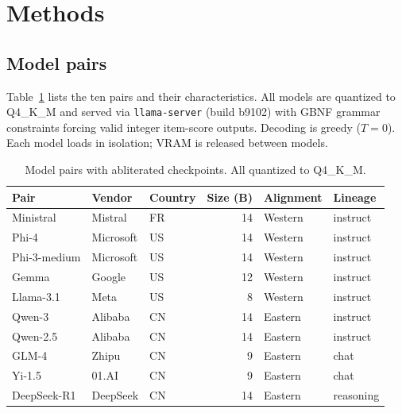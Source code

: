 \documentclass[11pt]{article}
\begin{document}
\section{Methods}

\subsection{Model pairs}
Table~\ref{tab:pairs} lists the ten pairs and their characteristics. All models are quantized to Q4\_K\_M and served via \texttt{llama-server} (build b9102) with GBNF grammar constraints forcing valid integer item-score outputs. Decoding is greedy ($T = 0$). Each model loads in isolation; VRAM is released between models.

\begin{table}[ht]
\centering
\caption{Model pairs with abliterated checkpoints. All quantized to Q4\_K\_M.}
\label{tab:pairs}
\small
\begin{tabular}{lllrll}
\toprule
Pair & Vendor & Country & Size (B) & Alignment & Lineage \\
\midrule
Ministral    & Mistral   & FR & 14 & Western & instruct  \\
Phi-4        & Microsoft & US & 14 & Western & instruct  \\
Phi-3-medium & Microsoft & US & 14 & Western & instruct  \\
Gemma        & Google    & US & 12 & Western & instruct  \\
Llama-3.1    & Meta      & US &  8 & Western & instruct  \\
Qwen-3       & Alibaba   & CN & 14 & Eastern & instruct  \\
Qwen-2.5     & Alibaba   & CN & 14 & Eastern & instruct  \\
GLM-4        & Zhipu     & CN &  9 & Eastern & chat      \\
Yi-1.5       & 01.AI     & CN &  9 & Eastern & chat      \\
DeepSeek-R1  & DeepSeek  & CN & 14 & Eastern & reasoning \\
\bottomrule
\end{tabular}
\end{table}
\end{document}
